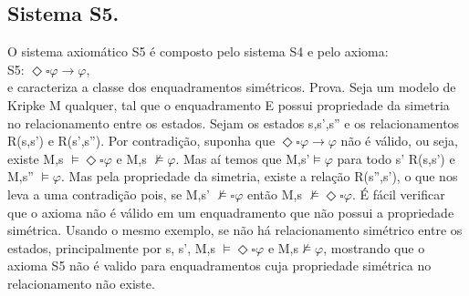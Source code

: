 \documentclass[12pt]{report}
\begin{document}
\subsection{ Sistema S5.}
\hspace{0.5cm} O sistema axiomático S5 é composto pelo sistema S4 e pelo axioma:\\
S5: $\Diamond \square \varphi \rightarrow \varphi $, \\
e caracteriza a classe dos enquadramentos simétricos. Prova. Seja um modelo de Kripke M qualquer, tal que o enquadramento E possui  propriedade da simetria no relacionamento entre os estados. Sejam os estados s,s',s'' e os relacionamentos R(s,s') e R(s',s''). Por contradição, suponha que $\Diamond \square \varphi \rightarrow \varphi $ não é válido, ou seja, existe M,s $\models \Diamond\square  \varphi $ e M,s $\nvDash \varphi $. Mas aí temos que M,s'$\models \varphi $ para todo s' R(s,s') e M,s'' $\models \varphi $. Mas pela propriedade da simetria, existe a relação R(s'',s'), o que nos leva a uma contradição pois, se M,s' $\nvDash \square \varphi $ então M,s $\nvDash  \Diamond \square \varphi $.
\indent É fácil verificar que o axioma não é válido em um enquadramento que não possui a propriedade simétrica. Usando o mesmo exemplo, se não há relacionamento simétrico entre os estados, principalmente por s, s', M,s $\models \Diamond \square \varphi $ e M,s$\nvDash \varphi $, mostrando que o axioma S5 não é valido para enquadramentos cuja propriedade simétrica no relacionamento não existe.


   
   

  
\end{document}
